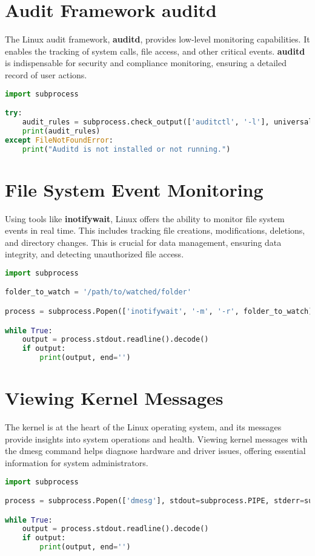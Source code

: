 \documentclass{VUMIFPSmagistrinis}
\begin{document}
\section{Audit Framework auditd}
The Linux audit framework, \textbf{auditd}, provides low-level monitoring capabilities. It enables the tracking of system calls, file access, and other critical events. \textbf{auditd} is indispensable for security and compliance monitoring, ensuring a detailed record of user actions.
\begin{lstlisting}[language=Python]
import subprocess

try:
    audit_rules = subprocess.check_output(['auditctl', '-l'], universal_newlines=True)
    print(audit_rules)
except FileNotFoundError:
    print("Auditd is not installed or not running.")
\end{lstlisting}

\section{File System Event Monitoring}
Using tools like \textbf{inotifywait}, Linux offers the ability to monitor file system events in real time. This includes tracking file creations, modifications, deletions, and directory changes. This is crucial for data management, ensuring data integrity, and detecting unauthorized file access.
\begin{lstlisting}[language=Python]
import subprocess

folder_to_watch = '/path/to/watched/folder'

process = subprocess.Popen(['inotifywait', '-m', '-r', folder_to_watch], stdout=subprocess.PIPE, stderr=subprocess.PIPE)

while True:
    output = process.stdout.readline().decode()
    if output:
        print(output, end='')
\end{lstlisting}

\section{Viewing Kernel Messages}
The kernel is at the heart of the Linux operating system, and its messages provide insights into system operations and health. Viewing kernel messages with the dmesg command helps diagnose hardware and driver issues, offering essential information for system administrators.
\begin{lstlisting}[language=Python]
import subprocess

process = subprocess.Popen(['dmesg'], stdout=subprocess.PIPE, stderr=subprocess.PIPE)

while True:
    output = process.stdout.readline().decode()
    if output:
        print(output, end='')
\end{lstlisting}
\end{document}
